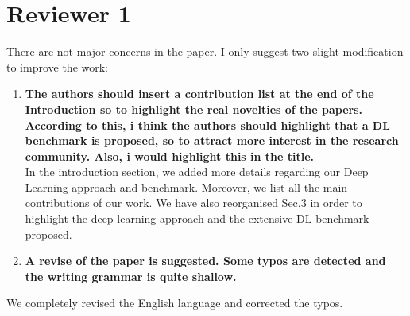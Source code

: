\documentclass[]{article}
\begin{document}
	\section{Reviewer 1}
	There are not major concerns in the paper. I only suggest two slight modification to improve the work:
	\begin{enumerate}
		\item \textbf{The authors should insert a contribution list at the end of the Introduction so to highlight the real novelties of the papers. According to this, i think the authors should highlight that a DL benchmark is proposed, so to attract more interest in the research community. Also, i would highlight this in the title.} \\
		
		In the introduction section, we added more details regarding our Deep Learning approach and benchmark. Moreover, we list all the main contributions of our work.  We have also reorganised Sec.3 in order to highlight the deep learning approach and the extensive DL benchmark proposed.
		
		\item \textbf{A revise of the paper is suggested. Some typos are detected and the writing grammar is quite shallow.} \\
	\end{enumerate}
	
	We completely revised the English language and corrected the typos.
	
\end{document}
